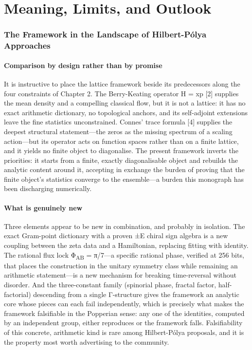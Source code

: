 \documentclass[10pt]{article}
\begin{document}
\part*{Meaning, Limits, and Outlook}
\section{The Framework in the Landscape of Hilbert-Pólya Approaches}\label{sec:ch13}
\subsection{Comparison by design rather than by promise}\label{sec:131}
It is instructive to place the lattice framework beside its predecessors along the four constraints of Chapter 2. The Berry-Keating operator H = xp [2] supplies the mean density and a compelling classical flow, but it is not a lattice: it has no exact arithmetic dictionary, no topological anchors, and its self-adjoint extensions leave the fine statistics unconstrained. Connes' trace formula [4] supplies the deepest structural statement---the zeros as the missing spectrum of a scaling action---but its operator acts on function spaces rather than on a finite lattice, and it yields no finite object to diagonalise. The present framework inverts the priorities: it starts from a finite, exactly diagonalisable object and rebuilds the analytic content around it, accepting in exchange the burden of proving that the finite object's statistics converge to the ensemble---a burden this monograph has been discharging numerically.

\subsection{What is genuinely new}\label{sec:132}
Three elements appear to be new in combination, and probably in isolation. The exact Gram-point dictionary with a proven ±E chiral sign algebra is a new coupling between the zeta data and a Hamiltonian, replacing fitting with identity. The rational flux lock Φ\textsubscript{AB} = π/7---a specific rational phase, verified at 256 bits, that places the construction in the unitary symmetry class while remaining an arithmetic statement---is a new mechanism for breaking time-reversal without disorder. And the three-constant family (spinorial phase, fractal factor, half-factorial) descending from a single Γ-structure gives the framework an analytic core whose pieces can each fail independently, which is precisely what makes the framework falsifiable in the Popperian sense: any one of the identities, computed by an independent group, either reproduces or the framework falls. Falsifiability of this concrete, arithmetic kind is rare among Hilbert-Pólya proposals, and it is the property most worth advertising to the community.
\end{document}
